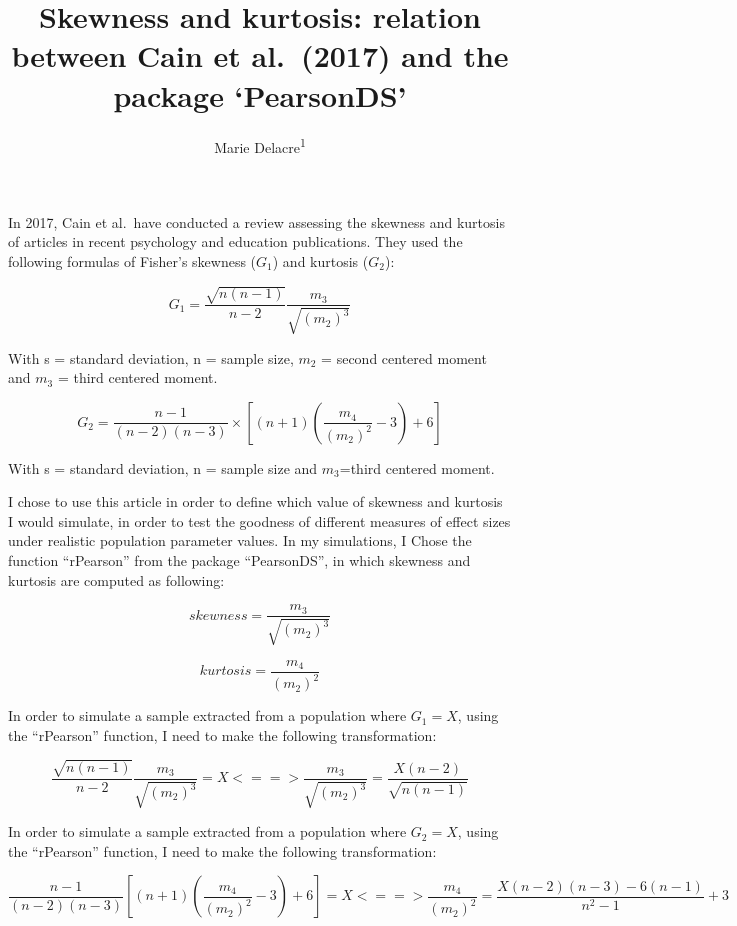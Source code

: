 \documentclass[man]{apa6}
\title{Skewness and kurtosis: relation between Cain et al.~(2017) and the package `PearsonDS'}
\author{Marie Delacre\textsuperscript{1}}
\date{}
\affiliation{
\vspace{0.5cm}
\textsuperscript{1} Service of Analysis of the Data, Université Libre de Bruxelles, Belgium}
\begin{document}
\maketitle

In 2017, Cain et al.~have conducted a review assessing the skewness and kurtosis of articles in recent psychology and education publications. They used the following formulas of Fisher's skewness (\(G_{1}\)) and kurtosis (\(G_{2}\)):

\begin{equation} 
G_{1}=\frac{\sqrt{n(n-1)}}{n-2} \frac{m_{3}}{\sqrt{(m_{2})^3}}
\label{eq:skew}
\end{equation}

With s = standard deviation, n = sample size, \(m_{2}\) = second centered moment and \(m_{3}\) = third centered moment.

\begin{equation} 
G_{2}=\frac{n-1}{(n-2)(n-3)}\times [(n+1)(\frac{m_{4}}{(m_{2})^2}-3)+6]
\label{eq:kurt}
\end{equation}

With s = standard deviation, n = sample size and \(m_{3}\)=third centered moment.

I chose to use this article in order to define which value of skewness and kurtosis I would simulate, in order to test the goodness of different measures of effect sizes under realistic population parameter values. In my simulations, I Chose the function \enquote{rPearson} from the package \enquote{PearsonDS}, in which skewness and kurtosis are computed as following:

\begin{equation} 
skewness=\frac{m_{3}}{\sqrt{(m_{2})^3}}
\label{eq:skewnessrPearson}
\end{equation}

\begin{equation} 
kurtosis=\frac{m_{4}}{(m_{2})^2}
\label{eq:kurtosisrPearson}
\end{equation}

In order to simulate a sample extracted from a population where \(G_{1}= X\), using the \enquote{rPearson} function, I need to make the following transformation:

\begin{equation} 
\frac{\sqrt{n(n-1)}}{n-2} \frac{m_{3}}{\sqrt{(m_{2})^3}} = X
<==> \frac{m_{3}}{\sqrt{(m_{2})^3}} = \frac{X(n-2)}{\sqrt{n(n-1)}}
\label{eq:skewnesstransformation}
\end{equation}

In order to simulate a sample extracted from a population where \(G_{2}= X\), using the \enquote{rPearson} function, I need to make the following transformation:

\begin{equation} 
\frac{n-1}{(n-2)(n-3)} [(n+1)(\frac{m_{4}}{(m_{2})^2}-3)+6] = X  
<==> \frac{m_{4}}{(m_{2})^2}=\frac{X(n-2)(n-3)-6(n-1)}{n^2-1}+3
\label{eq:kurtosistransformation}
\end{equation}
\end{document}

